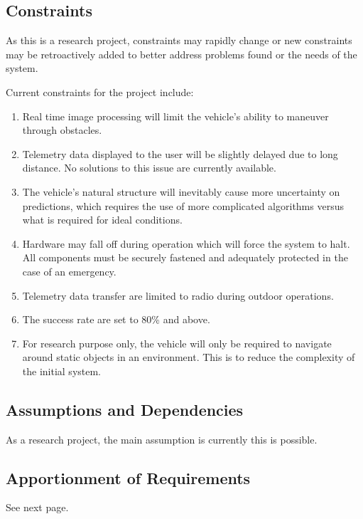 \documentclass[compsoc,draftclsnofoot,onecolumn,10pt]{IEEEtran}
\begin{document}
\subsection{Constraints} %
As this is a research project, constraints may rapidly change or new constraints may be retroactively added to better address problems found or the needs of the system. \par
Current constraints for the project include: 
\begin{enumerate}
	\item Real time image processing will limit the vehicle's ability to maneuver through obstacles. 
	\item Telemetry data displayed to the user will be slightly delayed due to long distance. 
	No solutions to this issue are currently available.
	\item The vehicle's natural structure will inevitably cause more uncertainty on predictions, which requires the use of more complicated algorithms versus what is required for ideal conditions.
	\item Hardware may fall off during operation which will force the system to halt. 
	All components must be securely fastened and adequately protected in the case of an emergency.  
	\item Telemetry data transfer are limited to radio during outdoor operations.
	\item The success rate are set to 80\% and above.
	\item For research purpose only, the vehicle will only be required to navigate around static objects in an environment. 
	This is to reduce the complexity of the initial system. 
\end{enumerate}

\subsection{Assumptions and Dependencies}
As a research project, the main assumption is currently this is possible. 

\subsection{Apportionment of Requirements} %
See next page.


\end{document}
